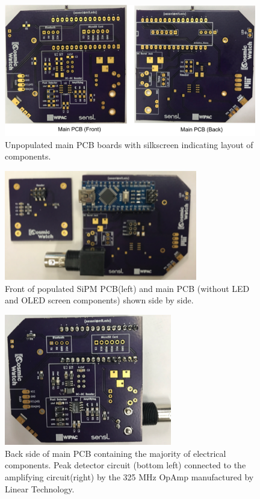 \begin{itemize}
\begin{figure}[htb]
\centering
\includegraphics[width=0.98\textwidth]{images/mainPCB.png} 
\caption{Unpopulated main PCB boards with silkscreen indicating layout of components.}
\label{MIT_mainPCB}
\end{figure}
\begin{figure}[htb]
\centering
\includegraphics[width=0.75\textwidth]{images/TopMainSiPMPOP.png} 
\caption{Front of populated SiPM PCB(left) and main PCB (without LED and OLED screen components) shown side by side.}
\label{MIT_MainSiPMPCB_POP}
\end{figure}
\begin{figure}[htb]
\centering
\includegraphics[width=0.65\textwidth]{images/MITMainPCBPOP.png} 
\caption{Back side of main PCB containing the majority of electrical components. Peak detector circuit (bottom left) connected to the amplifying circuit(right) by the 325 MHz OpAmp manufactured by Linear Technology.}
\label{MIT_mainPCB_POP}
\end{figure}


\end{itemize}
